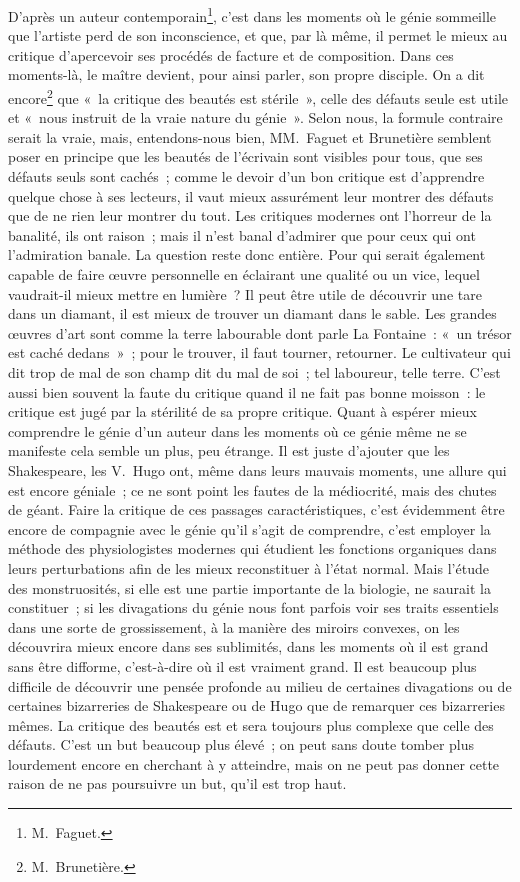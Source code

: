 \documentclass[french,twoside]{book} %
\begin{document}
D’après un auteur contemporain\footnote{M. Faguet.}, c’est dans les moments où le génie sommeille que l’artiste perd de son inconscience, et que, par là même, il permet le mieux au critique d’apercevoir ses procédés de facture et de composition. Dans ces moments-là, le maître devient, pour ainsi parler, son propre disciple. On a dit encore\footnote{M. Brunetière.} que « la critique des beautés est stérile », celle des défauts seule est utile et « nous instruit de la vraie nature du génie ». Selon nous, la formule contraire serait la vraie, mais, entendons-nous bien, MM. Faguet et Brunetière semblent poser en principe que les beautés de l’écrivain sont visibles pour tous, que ses défauts seuls sont cachés ; comme le devoir d’un bon critique est d’apprendre quelque chose à ses lecteurs, il vaut mieux assurément leur montrer des défauts que de ne rien leur montrer du tout. Les critiques modernes ont l’horreur de la banalité, ils ont raison ; mais il n’est banal d’admirer que pour ceux qui ont l’admiration banale. La question reste donc entière. Pour qui serait également capable de faire œuvre personnelle en éclairant une qualité ou un vice, lequel vaudrait-il mieux mettre en lumière ? Il peut être utile de découvrir une tare dans un diamant, il est mieux de trouver un diamant dans le sable. Les grandes œuvres d’art sont comme la terre labourable dont parle La Fontaine : « un trésor est caché dedans » ; pour le trouver, il faut tourner, retourner. Le cultivateur qui dit trop de mal de son champ dit du mal de soi ; tel laboureur, telle terre. C’est aussi bien souvent la faute du critique quand il ne fait pas bonne moisson : le critique est jugé par la stérilité de sa propre critique. Quant à espérer mieux comprendre le génie d’un auteur dans les moments où ce génie même ne se manifeste cela semble un plus, peu étrange. Il est juste d’ajouter que les Shakespeare, les V. Hugo ont, même dans leurs mauvais moments, une allure qui est encore géniale ; ce ne sont point les fautes de la médiocrité, mais des chutes de géant. Faire la critique de ces passages caractéristiques, c’est évidemment être encore de compagnie avec le génie qu’il s’agit de comprendre, c’est employer la méthode des physiologistes modernes qui étudient les fonctions organiques dans leurs perturbations afin de les mieux reconstituer à l’état normal. Mais l’étude des monstruosités, si elle est une partie importante de la biologie, ne saurait la constituer ; si les divagations du génie nous font parfois voir ses traits essentiels dans une sorte de grossissement, à la manière des miroirs convexes, on les découvrira mieux encore dans ses sublimités, dans les moments où il est grand sans être difforme, c’est-à-dire où il est vraiment grand. Il est beaucoup plus difficile de découvrir une pensée profonde au milieu de certaines divagations ou de certaines bizarreries de Shakespeare ou de Hugo que de remarquer ces bizarreries mêmes. La critique des beautés est et sera toujours plus complexe que celle des défauts. C’est un but beaucoup plus élevé ; on peut sans doute tomber plus lourdement encore en cherchant à y atteindre, mais on ne peut pas donner cette raison de ne pas poursuivre un but, qu’il est trop haut.\par
\end{document}
